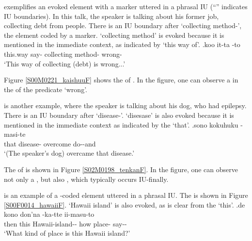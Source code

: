 \Next exemplifies an evoked element with a  marker
uttered in a phrasal IU
(``\tp{\dvline}'' indicates IU boundaries).
In this talk, the speaker is talking about his former job,
collecting debt from people.
There is an IU boundary after  `collecting method-', the element coded by a  marker.
 `collecting method' is evoked because
it is mentioned in the immediate context, as indicated by  `this way of'.
%
\exg.\label{S00M0221_kaishuu}koo it-ta \tp{\dvline}   \tp{\dvline} -to \tp{\dvline} \\
	this.way say- {} collecting method- {} wrong- {} \\
	`This way of collecting (debt) is wrong...'

Figure \ref{S00M0221_kaishuuF} shows the  of \Last.
In the figure,
one can observe a  in the  of the predicate  `wrong'.

\Next is another example,
where the speaker is talking about his dog,
who had epilepsy.
There is an IU boundary after  `disease-'.
 `disesase' is also evoked because it is mentioned in the immediate context
as indicated by the   `that'.
%
\exg.\label{S02M0198_tenkan}sono  \tp{\dvline} {kokuhuku} -masi-te \tp{\dvline} \\
		that disease- {} overcome do--and {} \\
		`(The speaker's dog) overcame that disease.'

The  of \Last is shown in Figure \ref{S02M0198_tenkanF}.
In the figure,
one can observe not only a ,
but also ,
which typically occurs IU-finally.

\Next is an example of a -coded element uttered in a phrasal IU.
The  is shown in Figure \ref{S00F0014_hawaiiF}.
 `Hawaii island' is also evoked,
as is clear from the   `this'.
%
\exg.\label{S00F0014_hawaii}de kono \tp{\dvline}  \tp{\dvline} don'na -ka-tte ii-masu-to \tp{\dvline} \\
		then this {} Hawaii-island-- {} how place- say-- {} \\
		`What kind of place is this Hawaii island?'

